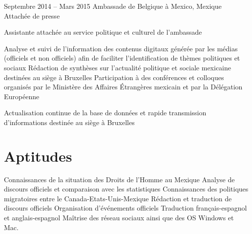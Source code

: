\documentclass[30pt, french]{tccv}
\begin{document}
\begin{upshape}
\begin{experience}
\vspace{0.5cm}
\item{Septembre 2014 -- Mars 2015}
     {Ambassade de Belgique à Mexico, Mexique}
     {Attachée de presse}
     \fontsize{10pt}{1.1em}\color{text}\bodyfontlight\upshape\selectfont

 Assistante attachée au service politique et culturel de l’ambassade \\
    \setlength{\parskip}{-10pt}
    \begin{itemize}
      \cvitem[\checkmark] Analyse et suivi de l’information des contenus digitaux générée par les médias (officiels et non officiels) afin de faciliter l’identification de thèmes politiques et sociaux 
      \cvitem[\checkmark] Rédaction de synthèses sur l’actualité politique et sociale mexicaine destinées au siège à Bruxelles
      \cvitem[\checkmark] Participation à des conférences et colloques organisés par le Ministère des Affaires Étrangères mexicain et par la Délégation Européenne
    \end{itemize}     
 Actualisation continue de la base de données et rapide transmission d’informations destinée au siège à Bruxelles 




\section{Aptitudes}
\setlength{\parskip}{0pt}
\begin{itemize}[leftmargin=13pt]
  \cvitem[\checkmark]  Connaissances de la situation des Droits de l’Homme au Mexique
  \cvitem[\checkmark]  Analyse de discours officiels et comparaison avec les statistiques
  \cvitem[\checkmark]  Connaissances des politiques migratoires entre le Canada-Etats-Unis-Mexique
  \cvitem[\checkmark]  Rédaction et traduction de discours officiels
  \cvitem[\checkmark]  Organisation d’événements officiels
  \cvitem[\checkmark]  Traduction français-espagnol et anglais-espagnol
  \cvitem[\checkmark]  Maîtrise des réseau sociaux ainsi que des OS Windows et Mac. 
\end{itemize}
\end{experience}





\end{upshape}
\end{document}
